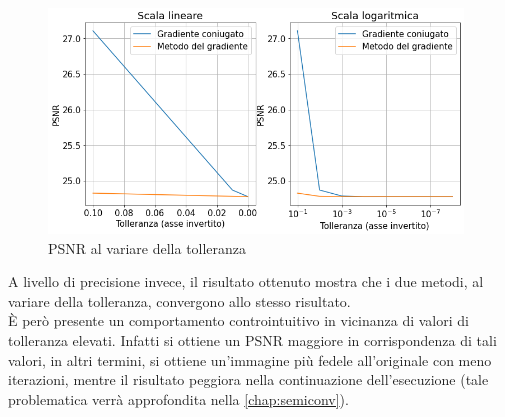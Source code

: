 \documentclass[11pt]{article}
\begin{document}
\begin{figure}[H]
    \centering
    \includegraphics[width=11cm]{iterazioni_cg_gd/1/tol_psnr.png}
    \caption{PSNR al variare della tolleranza}
    \label{fig:tol_psnr1}
\end{figure}
A livello di precisione invece, il risultato ottenuto mostra che i due metodi, al variare della tolleranza, convergono allo stesso risultato.\\
È però presente un comportamento controintuitivo in vicinanza di valori di tolleranza elevati. 
Infatti si ottiene un PSNR maggiore in corrispondenza di tali valori, in altri termini, si ottiene un'immagine più fedele all'originale con meno iterazioni, mentre il risultato peggiora nella continuazione dell'esecuzione (tale problematica verrà approfondita nella \autoref{chap:semiconv}).
\end{document}

